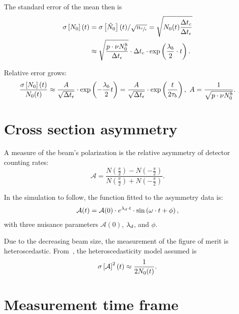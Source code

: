The standard error of the mean then is %
\begin{align*}
\SD{N_0}(t) & = \SD{\tilde{N}_0}(t)/\sqrt{\Ncm} = \sqrt{N_0(t)\frac{\dtc}{\dtm}}            \\
& \approx \sqrt{\frac{p\cdot\nu N_0^b}{\dtm}}\cdot\dtc \cdot\exp\bkt{\frac{\lamb}{2}\cdot t}.
\end{align*}
\newcommand{\Aa}{\frac{1}{\sqrt{p\cdot\nu N_0^b}}}

Relative error grows:
\begin{equation}\label{eq:MeasRelErr}
	\frac{\SD{N_0}(t)}{N_0(t)} \approx \frac{A}{\sqrt{\dtm}}\cdot\exp\bkt{-\frac{\lamb}{2}t} = \frac{A}{\sqrt{\dtm}}\cdot\exp\bkt{\frac{t}{2\LTb}},~ A=\Aa.
\end{equation}

\section{Cross section asymmetry}
\newcommand{\Asym}{\mathcal{A}}
A measure of the beam's polarization is the relative asymmetry of detector counting rates:~\cite[p.~17]{Eversmann:Thesis}
\begin{equation}\label{eq:AsymDef}
	\Asym = \frac{N(\frac\pi2) - N(-\frac\pi2)}{N(\frac\pi2)+N(-\frac\pi2)}.
\end{equation}

In the simulation to follow, the function fitted to the asymmetry data is:
\begin{equation}\label{eq:xFOM}
	\Asym(t) = \Asym(0)\cdot e^{\lamd\cdot t}\cdot\sin\bkt{\omega\cdot t + \phi},
\end{equation}
with three nuisance parameters $\Asym(0)$, $\lambda_d$, and $\phi$. 

Due to the decreasing beam size, the measurement of the figure of merit is heteroscedastic. From~\cite[p.~18]{Eversmann:Thesis}, the heteroscedasticity model assumed is
\begin{equation}\label{eq:AsymHtsk}
	\SD{\Asym}^2(t) \approx \frac{1}{2N_0(t)}.
\end{equation}

\section{Measurement time frame}
\newcommand{\dtnd}{\dt_{zc}}
\newcommand{\SNR}{\text{SNR}}
\newcommand{\deq}{\overset{\triangle}{=}}

